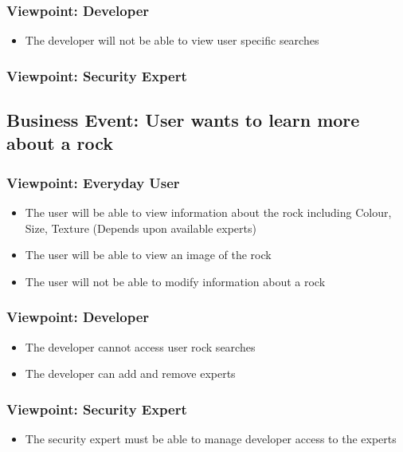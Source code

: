 \documentclass[titlepage]{article}
\begin{document}
  \subsubsection {Viewpoint: Developer}
    \begin{itemize}
      \item The developer will not be able to view user specific searches
    \end{itemize}
  \subsubsection {Viewpoint: Security Expert}
\subsection{Business Event: User wants to learn more about a rock}
  \subsubsection{Viewpoint: Everyday User}
    \begin{itemize}
      \item The user will be able to view information about the rock including Colour, Size, Texture (Depends upon available experts)
      \item The user will be able to view an image of the rock
      \item The user will not be able to modify information about a rock
    \end{itemize}
  \subsubsection{Viewpoint: Developer}
    \begin{itemize}
      \item The developer cannot access user rock searches
      \item The developer can add and remove experts
    \end{itemize}
  \subsubsection{Viewpoint: Security Expert}
    \begin{itemize}
      \item The security expert must be able to manage developer access to the experts
    \end{itemize}
\end{document}
